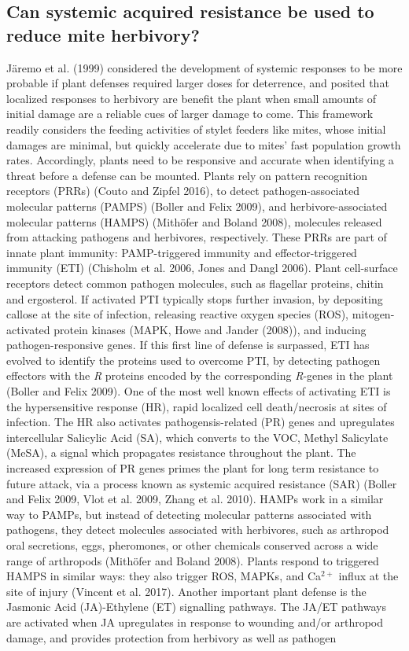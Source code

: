 \documentclass[12pt,final,CPage]{ufthesis}
\begin{document}
{  \hypertarget{litrev-sar}{%
  \subsection{Can systemic acquired resistance be used to reduce mite herbivory?}\label{litrev-sar}}

  Järemo et al. (1999) considered the development of systemic responses to be more probable if plant defenses required larger doses for deterrence, and posited that localized responses to herbivory are benefit the plant when small amounts of initial damage are a reliable cues of larger damage to come. This framework readily considers the feeding activities of stylet feeders like mites, whose initial damages are minimal, but quickly accelerate due to mites' fast population growth rates. Accordingly, plants need to be responsive and accurate when identifying a threat before a defense can be mounted. Plants rely on pattern recognition receptors (PRRs) (Couto and Zipfel 2016), to detect pathogen-associated molecular patterns (PAMPS) (Boller and Felix 2009), and herbivore-associated molecular patterns (HAMPS) (Mithöfer and Boland 2008), molecules released from attacking pathogens and herbivores, respectively. These PRRs are part of innate plant immunity: PAMP-triggered immunity and effector-triggered immunity (ETI) (Chisholm et al. 2006, Jones and Dangl 2006). Plant cell-surface receptors detect common pathogen molecules, such as flagellar proteins, chitin and ergosterol. If activated PTI typically stops further invasion, by depositing callose at the site of infection, releasing reactive oxygen species (ROS), mitogen-activated protein kinases (MAPK, Howe and Jander (2008)), and inducing pathogen-responsive genes. If this first line of defense is surpassed, ETI has evolved to identify the proteins used to overcome PTI, by detecting pathogen effectors with the \emph{R} proteins encoded by the corresponding \emph{R}-genes in the plant (Boller and Felix 2009). One of the most well known effects of activating ETI is the hypersensitive response (HR), rapid localized cell death/necrosis at sites of infection. The HR also activates pathogensis-related (PR) genes and upregulates intercellular Salicylic Acid (SA), which converts to the VOC, Methyl Salicylate (MeSA), a signal which propagates resistance throughout the plant. The increased expression of PR genes primes the plant for long term resistance to future attack, via a process known as systemic acquired resistance (SAR) (Boller and Felix 2009, Vlot et al. 2009, Zhang et al. 2010). HAMPs work in a similar way to PAMPs, but instead of detecting molecular patterns associated with pathogens, they detect molecules associated with herbivores, such as arthropod oral secretions, eggs, pheromones, or other chemicals conserved across a wide range of arthropods (Mithöfer and Boland 2008). Plants respond to triggered HAMPS in similar ways: they also trigger ROS, MAPKs, and Ca\({^{2+}}\) influx at the site of injury (Vincent et al. 2017). Another important plant defense is the Jasmonic Acid (JA)-Ethylene (ET) signalling pathways. The JA/ET pathways are activated when JA upregulates in response to wounding and/or arthropod damage, and provides protection from herbivory as well as pathogen }
\end{document}
